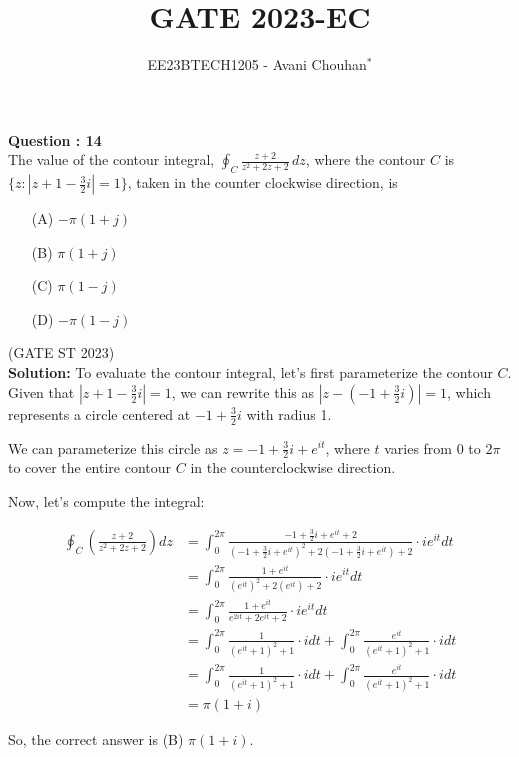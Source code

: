 \documentclass[journal,12pt,twocolumn]{IEEEtran}
\theoremstyle{remark}
\begin{document}

\vspace{3cm}

\title{GATE 2023-EC}
\author{EE23BTECH1205 - Avani Chouhan$^{*}$%
}
\maketitle
\newpage
\bigskip

\renewcommand{\thefigure}{\theenumi}
\renewcommand{\thetable}{\theenumi}

\vspace{3cm}
\textbf{Question : 14} \\
The value of the contour integral, $\oint_C \frac{z + 2}{z^2 + 2z + 2} \, dz$, where the contour $C$ is $\{ z : |z + 1 - \frac{3}{2}i| = 1 \}$, taken in the counter clockwise direction, is \\

\begin{enumerate}
  \item[(A)] $-\pi(1+j) $
  \item[(B)] $\pi(1+j)$
  \item[(C)] $\pi(1-j) $
  \item[(D)] $-\pi(1-j)$
\end{enumerate}

\hfill{(GATE ST 2023)}\\
\textbf{Solution:}
To evaluate the contour integral, let's first parameterize the contour $C$. Given that $|z + 1 - \frac{3}{2}i| = 1$, we can rewrite this as $|z - (-1 + \frac{3}{2}i)| = 1$, which represents a circle centered at $-1 + \frac{3}{2}i$ with radius 1. 

We can parameterize this circle as $z = -1 + \frac{3}{2}i + e^{it}$, where $t$ varies from $0$ to $2\pi$ to cover the entire contour $C$ in the counterclockwise direction.

Now, let's compute the integral:

\begin{align}
\oint_C \left(\frac{z+2}{z^2 + 2z + 2}\right) dz &= \int_0^{2\pi} \frac{-1 + \frac{3}{2}i + e^{it} + 2}{(-1 + \frac{3}{2}i + e^{it})^2 + 2(-1 + \frac{3}{2}i + e^{it}) + 2} \cdot ie^{it} dt \\
&= \int_0^{2\pi} \frac{1 + e^{it}}{(e^{it})^2 + 2(e^{it}) + 2} \cdot ie^{it} dt \\
&= \int_0^{2\pi} \frac{1 + e^{it}}{e^{2it} + 2e^{it} + 2} \cdot ie^{it} dt \\
&= \int_0^{2\pi} \frac{1}{(e^{it} + 1)^2 + 1} \cdot i dt + \int_0^{2\pi} \frac{e^{it}}{(e^{it} + 1)^2 + 1} \cdot i dt \\
&= \int_0^{2\pi} \frac{1}{(e^{it} + 1)^2 + 1} \cdot i dt + \int_0^{2\pi} \frac{e^{it}}{(e^{it} + 1)^2 + 1} \cdot i dt \\
&= \pi(1 + i)
\end{align}

So, the correct answer is (B) $\pi(1 + i)$.
\end{document}
